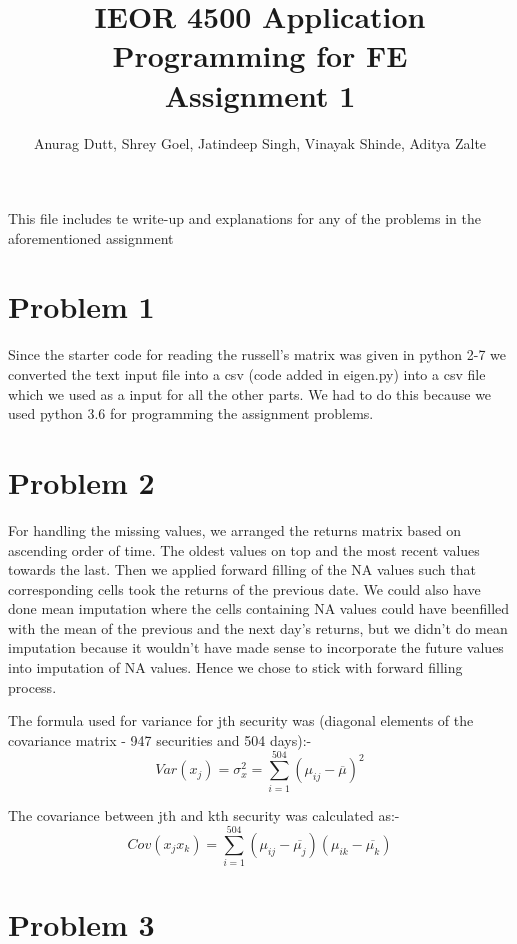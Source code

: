 \documentclass[twoside,11pt]{article}
\title{IEOR 4500 Application Programming for FE \\
  \large Assignment 1
} %
\author{Anurag Dutt, Shrey Goel, Jatindeep Singh, Vinayak Shinde, Aditya Zalte}    %
\begin{document}
\maketitle
This file includes te write-up and explanations for any of the problems in the aforementioned assignment

\section*{Problem 1}
Since the starter code for reading the russell's matrix was given in python 2-7 we converted the text input file into a csv (code added in eigen.py) into a csv file which we used as a input for all the other parts. We had to do this because we used python 3.6 for programming the assignment problems. 

\section*{Problem 2}
For handling the missing values, we arranged the returns matrix	based on ascending order of time. The oldest values on top and the most	recent values towards the last.	Then we	applied	forward filling of the NA values such	that corresponding cells took the returns of the previous date.	We could also have done	mean imputation	where the cells	containing NA values could have	beenfilled with the mean of the previous and	the next day's returns,	but we didn't do mean imputation because it wouldn't have made sense to	incorporate the	future values into imputation of NA values. Hence we chose to stick with forward filling process.

The formula used for variance for jth security was (diagonal elements of the covariance matrix - 947 securities and 504 days):-
\begin{equation}
  Var(x_j) = \sigma_x^2 = \sum_{i = 1}^{504} (\mu_{ij}-\overline{\mu})^2
\end{equation}

The covariance between jth and kth security was calculated as:-
\begin{equation}
  Cov(x_jx_k) = \sum_{i = 1}^{504} (\mu_{ij}-\overline{\mu_j})(\mu_{ik}-\overline{\mu_k})
\end{equation}


\section*{Problem 3}
\end{document}
